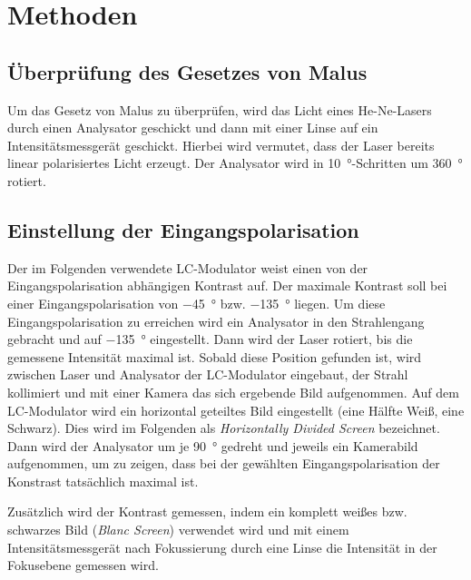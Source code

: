 \documentclass[
	a4paper,
	12pt,
	pagesize,
	ngerman
]{scrartcl}
\begin{document}
	\section{Methoden}

	\subsection{Überprüfung des Gesetzes von Malus}
	Um das Gesetz von Malus zu überprüfen, wird das Licht eines He-Ne-Lasers durch einen Analysator geschickt und dann mit einer Linse auf ein Intensitätsmessgerät geschickt. %
	Hierbei wird vermutet, dass der Laser bereits linear polarisiertes Licht erzeugt.
	Der Analysator wird in \SI{10}{\degree}-Schritten um \SI{360}{\degree} rotiert.

	\subsection{Einstellung der Eingangspolarisation}
	Der im Folgenden verwendete LC-Modulator weist einen von der Eingangspolarisation abhängigen Kontrast auf.
	Der maximale Kontrast soll bei einer Eingangspolarisation von \SI{-45}{\degree} bzw. \SI{-135}{\degree} liegen.
	Um diese Eingangspolarisation zu erreichen wird ein Analysator in den Strahlengang gebracht und auf \SI{-135}{\degree} eingestellt.
	Dann wird der Laser rotiert, bis die gemessene Intensität maximal ist.
	Sobald diese Position gefunden ist, wird zwischen Laser und Analysator der LC-Modulator eingebaut, der Strahl kollimiert und mit einer Kamera das sich ergebende Bild aufgenommen.
	Auf dem LC-Modulator wird ein horizontal geteiltes Bild eingestellt (eine Hälfte Weiß, eine Schwarz).
	Dies wird im Folgenden als \textit{Horizontally Divided Screen} bezeichnet.
	Dann wird der Analysator um je \SI{90}{\degree} gedreht und jeweils ein Kamerabild aufgenommen, um zu zeigen, dass bei der gewählten Eingangspolarisation der Konstrast tatsächlich maximal ist. %

	Zusätzlich wird der Kontrast gemessen, indem ein komplett weißes bzw. schwarzes Bild (\textit{Blanc Screen}) verwendet wird und mit einem Intensitätsmessgerät nach Fokussierung durch eine Linse die Intensität in der Fokusebene gemessen wird.
\end{document}
